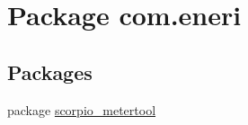 \hypertarget{namespacecom_1_1eneri}{}\section{Package com.\+eneri}
\label{namespacecom_1_1eneri}
\subsection*{Packages}
\begin{DoxyCompactItemize}
\item 
package \hyperlink{namespacecom_1_1eneri_1_1scorpio__metertool}{scorpio\+\_\+metertool}
\end{DoxyCompactItemize}
